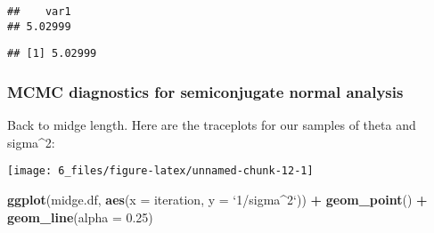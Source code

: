 \documentclass[]{article}
\newenvironment{Shaded}{\begin{snugshade}}{\end{snugshade}}
\newcommand{\DataTypeTok}[1]{\textcolor[rgb]{0.13,0.29,0.53}{#1}}
\newcommand{\FloatTok}[1]{\textcolor[rgb]{0.00,0.00,0.81}{#1}}
\newcommand{\KeywordTok}[1]{\textcolor[rgb]{0.13,0.29,0.53}{\textbf{#1}}}
\newcommand{\NormalTok}[1]{#1}
\newcommand{\OperatorTok}[1]{\textcolor[rgb]{0.81,0.36,0.00}{\textbf{#1}}}
\newcommand{\StringTok}[1]{\textcolor[rgb]{0.31,0.60,0.02}{#1}}
\begin{document}
\begin{Shaded}
\end{Shaded}

\begin{verbatim}
##    var1 
## 5.02999
\end{verbatim}

\begin{Shaded}
\end{Shaded}

\begin{verbatim}
## [1] 5.02999
\end{verbatim}

\hypertarget{mcmc-diagnostics-for-semiconjugate-normal-analysis}{%
\subsubsection{MCMC diagnostics for semiconjugate normal
analysis}\label{mcmc-diagnostics-for-semiconjugate-normal-analysis}}

Back to midge length. Here are the traceplots for our samples of theta
and sigma\^{}2:

\begin{Shaded}
\end{Shaded}

\begin{center}\texttt{[image: 6\_files/figure-latex/unnamed-chunk-12-1]} \end{center}

\begin{Shaded}
\begin{Highlighting}[]
\KeywordTok{ggplot}\NormalTok{(midge.df, }\KeywordTok{aes}\NormalTok{(}\DataTypeTok{x =}\NormalTok{ iteration, }\DataTypeTok{y =} \StringTok{`}\DataTypeTok{1/sigma^2}\StringTok{`}\NormalTok{)) }\OperatorTok{+}
\StringTok{  }\KeywordTok{geom_point}\NormalTok{() }\OperatorTok{+}\StringTok{ }\KeywordTok{geom_line}\NormalTok{(}\DataTypeTok{alpha =} \FloatTok{0.25}\NormalTok{)}
\end{Highlighting}
\end{Shaded}
\end{document}
